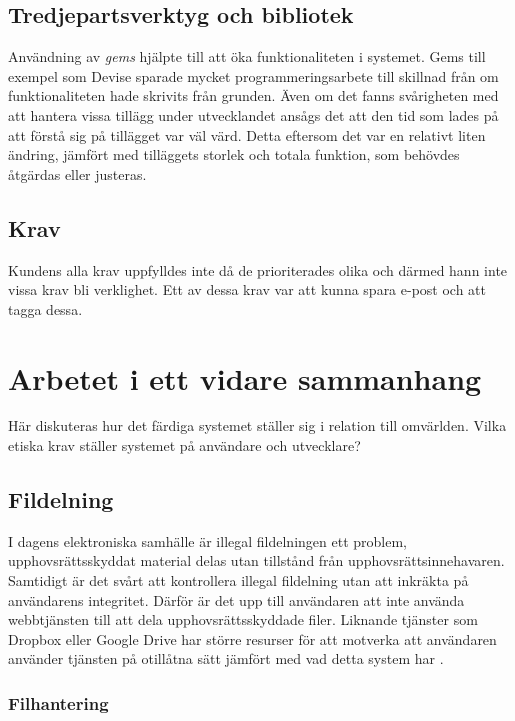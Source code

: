 \subsection{Tredjepartsverktyg och bibliotek}

Användning av \emph{gems} hjälpte till att öka funktionaliteten i systemet.
Gems till exempel som Devise sparade mycket programmeringsarbete till skillnad
från om funktionaliteten hade skrivits från grunden. Även om det fanns
svårigheten med att hantera vissa tillägg under utvecklandet ansågs det att den
tid som lades på att förstå sig på tillägget var väl värd. Detta eftersom det
var en relativt liten ändring, jämfört med tilläggets storlek och totala
funktion, som behövdes åtgärdas eller justeras.

\subsection{Krav}

Kundens alla krav uppfylldes inte då de prioriterades olika och därmed hann
inte vissa krav bli verklighet. Ett av dessa krav var att kunna spara e-post
och att tagga dessa.

\section{Arbetet i ett vidare sammanhang}

Här diskuteras hur det färdiga systemet ställer sig i relation till omvärlden. Vilka etiska krav ställer systemet på användare och utvecklare?

\subsection{Fildelning}

I dagens elektroniska samhälle är illegal fildelningen ett problem,
upphovsrättsskyddat material delas utan tillstånd från upphovsrättsinnehavaren.
Samtidigt är det svårt att kontrollera illegal fildelning utan att inkräkta på
användarens integritet. Därför är det upp till användaren att inte använda
webbtjänsten till att dela upphovsrättsskyddade filer.  Liknande tjänster som
Dropbox eller Google Drive har större resurser för att motverka att användaren
använder tjänsten på otillåtna sätt jämfört med vad detta system har
\cite{techcrunch}.

\subsubsection{Filhantering}

